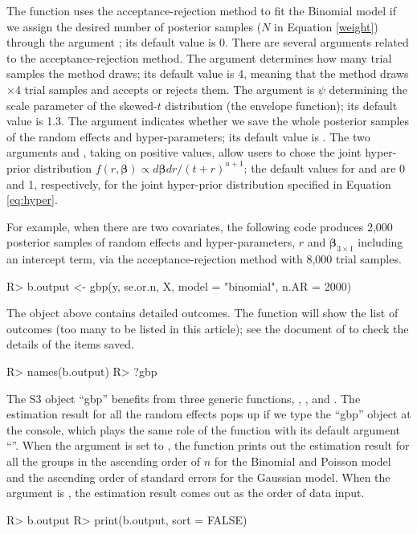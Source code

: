 \documentclass[article]{jss}
\begin{document}
The function  uses the acceptance-rejection method to fit the Binomial model if we assign the desired number of posterior samples ($N$ in Equation \ref{weight}) through the argument ; its default value is 0. There are several arguments related to the acceptance-rejection method. The argument  determines how many trial samples the method draws; its default value is 4, meaning that the method draws  $\times4$ trial samples and accepts or rejects them. The argument  is $\psi$ determining the scale parameter of the skewed-$t$ distribution (the envelope function); its default value is 1.3. The argument  indicates whether we save the whole posterior samples of the random effects and hyper-parameters; its default value is . The two arguments  and , taking on positive values, allow users to chose the joint hyper-prior distribution $f(r, \boldsymbol{\beta})\propto d\boldsymbol{\beta}dr/(t+r)^{u+1}$; the default values for  and  are 0 and 1, respectively, for the joint hyper-prior distribution specified in Equation \ref{eq:hyper}. 

For example, when there are two covariates, the following code produces 2,000 posterior samples of random effects and hyper-parameters, $r$ and $\boldsymbol{\beta}_{3\times1}$ including an intercept term, via the acceptance-rejection method with 8,000 trial samples.
\begin{CodeChunk}
\begin{CodeInput}
R> b.output <- gbp(y, se.or.n, X, model = "binomial", n.AR = 2000)
\end{CodeInput}
\end{CodeChunk}

The object  above contains detailed outcomes. The function  will show the list of outcomes (too many to be listed in this article); see the document of  to check the details of the items saved.
\begin{CodeChunk}
\begin{CodeInput}
R> names(b.output)
R> ?gbp
\end{CodeInput}
\end{CodeChunk}

The S3 object ``gbp'' benefits from three generic functions, , , and . The estimation result for all the random effects pops up if we type the ``gbp'' object at the  console, which plays the same role of the function  with its default argument ``''. When the argument  is set to , the function  prints out the estimation result for all the groups in the ascending order of $n$ for the Binomial and Poisson model and the ascending order of standard errors for the Gaussian model. When the argument  is , the estimation result comes out as the order of data input.
\begin{CodeChunk}
\begin{CodeInput}
R> b.output
R> print(b.output, sort = FALSE)
\end{CodeInput}
\end{CodeChunk}
\end{document}
